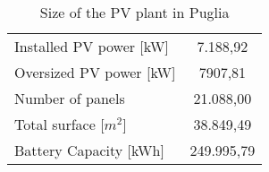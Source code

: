 \begin{table}[hp]
\centering
\begin{tabular}{|l|c|}
\hline
\rowcolor{bluepoli!40}\multicolumn{2}{|c|}{\cellcolor{bluepoli!40}\textbf{PV Plant Sizing}} \\ \hline
Installed PV   power [kW] & 7.188,92   \\ \hline
Oversized PV   power [kW] & 7907,81   \\ \hline
Number of   panels        & 21.088,00  \\ \hline
Total surface   [$m^2$]   & 38.849,49  \\ \hline
Battery   Capacity [kWh]  & 249.995,79 \\ \hline
\end{tabular}
\caption{Size of the PV plant in Puglia}
\label{tab:pvpuglisize}
\end{table}
